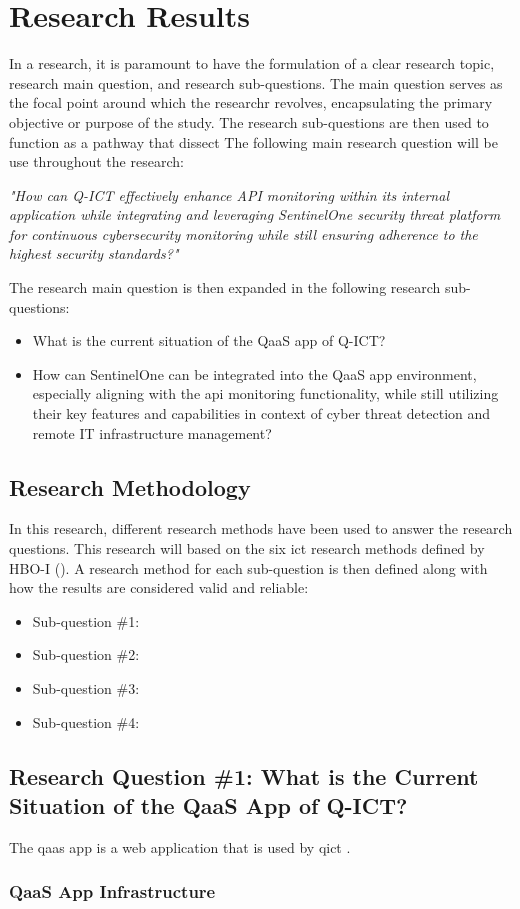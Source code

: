 \chapter{Research Results}
\begin{multicols}{2}
    In a research, it is paramount to have the formulation of a clear research topic, research main question, and research
    sub-questions. The main question serves as the focal point around which the researchr revolves, encapsulating the primary
    objective or purpose of the study. The research sub-questions are then used to function as a pathway that dissect
    The following main research question will be use throughout the research:
    \begin{center}
        \textit{"How can Q-ICT effectively enhance API monitoring within its internal application while integrating
            and leveraging SentinelOne security threat platform for continuous cybersecurity monitoring while
            still ensuring adherence to the highest security standards?"}
    \end{center}
    The research main question is then expanded in the following research sub-questions:
    \begin{itemize}
        \item What is the current situation of the QaaS app of Q-ICT?
        \item How can SentinelOne can be integrated into the QaaS app environment, especially aligning with the
              \acrshort{api} monitoring functionality, while still utilizing their key features and capabilities in
              context of cyber threat detection and remote IT infrastructure management?
    \end{itemize}
    \section{Research Methodology}
    In this research, different research methods have been used to answer the research questions. This research will
    based on the six \acrshort{ict} research methods defined by HBO-I (\cite{ictresearchmethods}). A research method for
    each sub-question is then defined along with how the results are considered valid and reliable:
    \begin{itemize}[label=-]
        \item Sub-question \#1:
        \item Sub-question \#2:
        \item Sub-question \#3:
        \item Sub-question \#4:
    \end{itemize}
    \section{Research Question \#1: What is the Current Situation of the QaaS App of Q-ICT?}
    The \acrshort{qaas} app is a web application that is used by \acrshort{qict} .
    \subsection{QaaS App Infrastructure}
\end{multicols}